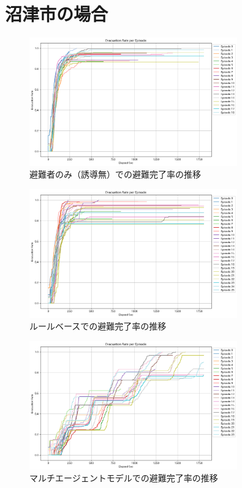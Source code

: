 \section{沼津市の場合}

\begin{figure}[H]
  \centering
  \includegraphics[width=0.8\textwidth]{Figures/Numazu-EvaOnly-ERE.png}
  \caption{避難者のみ（誘導無）での避難完了率の推移}
\end{figure}

\begin{figure}[H] 
  \centering 
  \includegraphics[width=0.8\textwidth]{Figures/Numazu-RuleModel-ERE.png}
  \caption{ルールベースでの避難完了率の推移}

\end{figure}

\begin{figure}[H] 
  \centering 
  \includegraphics[width=0.8\textwidth]{Figures/Numazu-AgentModel-ERE.png}
  \caption{マルチエージェントモデルでの避難完了率の推移}
\end{figure}


